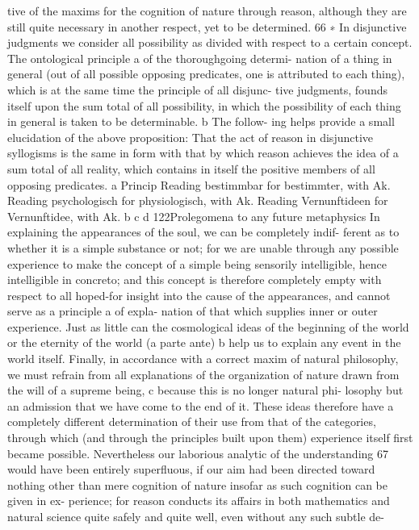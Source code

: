 tive of the maxims for the cognition of nature through reason, although
they are still quite necessary in another respect, yet to be determined. 66
∗ In disjunctive judgments we consider all possibility as divided with respect to
a certain concept. The ontological principle a of the thoroughgoing determi-
nation of a thing in general (out of all possible opposing predicates, one is
attributed to each thing), which is at the same time the principle of all disjunc-
tive judgments, founds itself upon the sum total of all possibility, in which the
possibility of each thing in general is taken to be determinable. b The follow-
ing helps provide a small elucidation of the above proposition: That the act of
reason in disjunctive syllogisms is the same in form with that by which reason
achieves the idea of a sum total of all reality, which contains in itself the positive
members of all opposing predicates.
a Princip
Reading bestimmbar for bestimmter, with Ak.
Reading psychologisch for physiologisch, with Ak.
Reading Vernunftideen for Vernunftidee, with Ak.
b
c
d
122Prolegomena to any future metaphysics
In explaining the appearances of the soul, we can be completely indif-
ferent as to whether it is a simple substance or not; for we are unable
through any possible experience to make the concept of a simple being
sensorily intelligible, hence intelligible in concreto; and this concept is
therefore completely empty with respect to all hoped-for insight into
the cause of the appearances, and cannot serve as a principle a of expla-
nation of that which supplies inner or outer experience. Just as little can
the cosmological ideas of the beginning of the world or the eternity of
the world (a parte ante) b help us to explain any event in the world itself.
Finally, in accordance with a correct maxim of natural philosophy, we
must refrain from all explanations of the organization of nature drawn
from the will of a supreme being, c because this is no longer natural phi-
losophy but an admission that we have come to the end of it. These
ideas therefore have a completely different determination of their use
from that of the categories, through which (and through the principles
built upon them) experience itself ﬁrst became possible. Nevertheless
our laborious analytic of the understanding 67 would have been entirely
superﬂuous, if our aim had been directed toward nothing other than
mere cognition of nature insofar as such cognition can be given in ex-
perience; for reason conducts its affairs in both mathematics and natural
science quite safely and quite well, even without any such subtle de-
